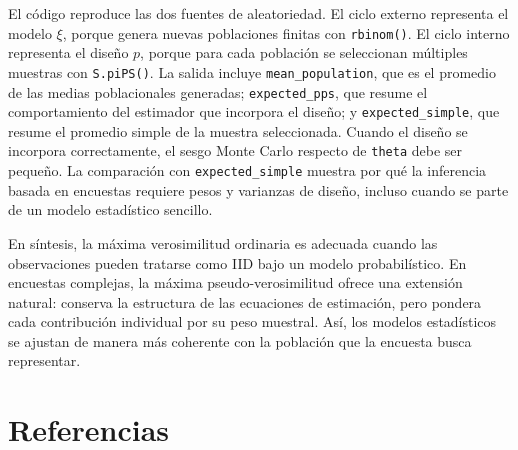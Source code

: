 \documentclass[
  spanish,
  12pt,
]{book}
\begin{document}
El código reproduce las dos fuentes de aleatoriedad. El ciclo externo representa el modelo \(\xi\), porque genera nuevas poblaciones finitas con \texttt{rbinom()}. El ciclo interno representa el diseño \(p\), porque para cada población se seleccionan múltiples muestras con \texttt{S.piPS()}. La salida incluye \texttt{mean\_population}, que es el promedio de las medias poblacionales generadas; \texttt{expected\_pps}, que resume el comportamiento del estimador que incorpora el diseño; y \texttt{expected\_simple}, que resume el promedio simple de la muestra seleccionada. Cuando el diseño se incorpora correctamente, el sesgo Monte Carlo respecto de \texttt{theta} debe ser pequeño. La comparación con \texttt{expected\_simple} muestra por qué la inferencia basada en encuestas requiere pesos y varianzas de diseño, incluso cuando se parte de un modelo estadístico sencillo.

En síntesis, la máxima verosimilitud ordinaria es adecuada cuando las observaciones pueden tratarse como IID bajo un modelo probabilístico. En encuestas complejas, la máxima pseudo-verosimilitud ofrece una extensión natural: conserva la estructura de las ecuaciones de estimación, pero pondera cada contribución individual por su peso muestral. Así, los modelos estadísticos se ajustan de manera más coherente con la población que la encuesta busca representar.

\chapter*{Referencias}\label{referencias}


\end{document}
